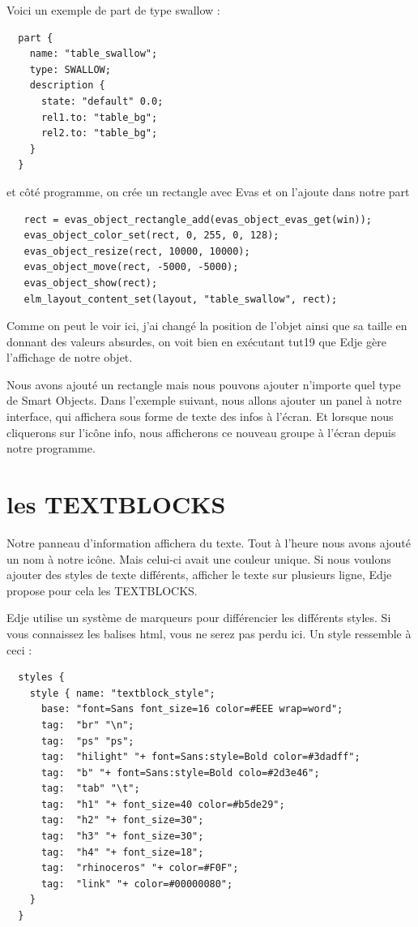 \documentclass[a4paper]{efr}
\begin{document}
Voici un exemple de part de type swallow :
\begin{lstlisting}
  part {
    name: "table_swallow";
    type: SWALLOW;
    description {
      state: "default" 0.0;
      rel1.to: "table_bg";
      rel2.to: "table_bg";
    }
  }
\end{lstlisting}

et côté programme, on crée un rectangle avec Evas et on l'ajoute dans notre part
\begin{lstlisting}
   rect = evas_object_rectangle_add(evas_object_evas_get(win));
   evas_object_color_set(rect, 0, 255, 0, 128);
   evas_object_resize(rect, 10000, 10000);
   evas_object_move(rect, -5000, -5000);
   evas_object_show(rect);
   elm_layout_content_set(layout, "table_swallow", rect);
\end{lstlisting}

Comme on peut le voir ici, j'ai changé la position de l'objet ainsi que sa
taille en donnant des valeurs absurdes, on voit bien en exécutant tut19 que
Edje gère l'affichage de notre objet.

Nous avons ajouté un rectangle mais nous pouvons ajouter n'importe quel type
de Smart Objects.
Dans l'exemple suivant, nous allons ajouter un panel à notre interface, qui
affichera sous forme de texte des infos à l'écran. Et lorsque nous cliquerons
sur l'icône info, nous afficherons ce nouveau groupe à l'écran depuis notre
programme.

\section{les TEXTBLOCKS}

Notre panneau d'information affichera du texte. Tout à l'heure nous avons
ajouté un nom à notre icône. Mais celui-ci avait une couleur unique. Si nous
voulons ajouter des styles de texte différents, afficher le texte sur plusieurs
ligne, Edje propose pour cela les TEXTBLOCKS.

Edje utilise un système de marqueurs pour différencier les différents styles.
Si vous connaissez les balises html, vous ne serez pas perdu ici.
Un style ressemble à ceci :
\begin{lstlisting}
  styles {
    style { name: "textblock_style";
      base: "font=Sans font_size=16 color=#EEE wrap=word";
      tag:  "br" "\n";
      tag:  "ps" "ps";
      tag:  "hilight" "+ font=Sans:style=Bold color=#3dadff";
      tag:  "b" "+ font=Sans:style=Bold colo=#2d3e46";
      tag:  "tab" "\t";
      tag:  "h1" "+ font_size=40 color=#b5de29";
      tag:  "h2" "+ font_size=30";
      tag:  "h3" "+ font_size=30";
      tag:  "h4" "+ font_size=18";
      tag:  "rhinoceros" "+ color=#F0F";
      tag:  "link" "+ color=#00000080";
    }
  }
\end{lstlisting}
\end{document}
